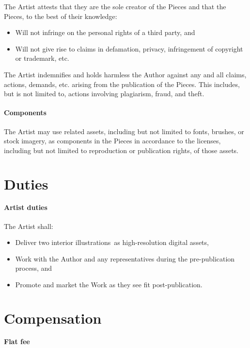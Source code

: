 \documentclass[12pt,letterpaper]{article}
\def\ArtType{two interior illustrations}
\begin{document}
The Artist attests that they are the sole creator of the Pieces and that the Pieces, to the best of their knowledge:

\begin{itemize}
    \item Will not infringe on the personal rights of a third party, and
    \item Will not give rise to claims in defamation, privacy, infringement of copyright or trademark, etc.
\end{itemize}

The Artist indemnifies and holds harmless the Author against any and all claims, actions, demands, etc. arising from the publication of the Pieces. This includes, but is not limited to, actions involving plagiarism, fraud, and theft.

\paragraph{Components}

The Artist may use related assets, including but not limited to fonts, brushes, or stock imagery, as components in the Pieces in accordance to the licenses, including but not limited to reproduction or publication rights, of those assets.

\section{Duties}

\paragraph{Artist duties}

The Artist shall:

\begin{itemize}
    \item Deliver \ArtType\ as high-resolution digital assets,
    \item Work with the Author and any representatives during the pre-publication process, and
    \item Promote and market the Work as they see fit post-publication.
\end{itemize}

\section{Compensation}

\paragraph{Flat fee}
\end{document}
